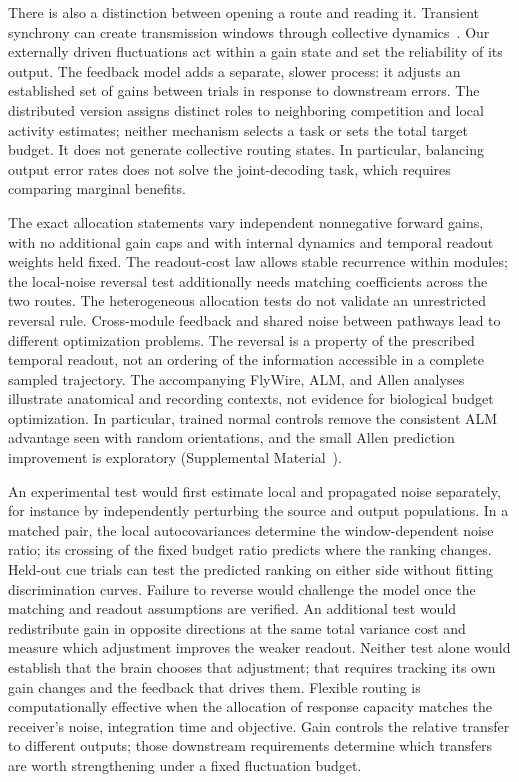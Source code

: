 \documentclass[aps,10pt,onecolumn,superscriptaddress,nofootinbib,longbibliography,
  amsmath,amssymb,floatfix]{revtex4-2}
\begin{document}
There is also a distinction between opening a route and reading
it. Transient synchrony can create transmission windows through
collective dynamics~\cite{palmigiano2017routing}. Our externally
driven fluctuations act within a gain state and set the reliability
of its output. The feedback model adds a separate, slower process:
it adjusts an established set of gains between trials in response
to downstream errors. The distributed version assigns distinct
roles to neighboring competition and local activity estimates;
neither mechanism selects a task or sets the total target budget.
It does not generate collective routing states.
In particular, balancing output error rates does not solve the
joint-decoding task, which requires comparing marginal benefits.

The exact allocation statements vary independent nonnegative forward
gains, with no additional gain caps and with internal dynamics and
temporal readout weights held fixed. The readout-cost law allows
stable recurrence within modules; the local-noise reversal test
additionally needs matching coefficients across the two routes.
The heterogeneous allocation tests do not validate an unrestricted
reversal rule. Cross-module feedback and shared noise between
pathways lead to different optimization problems. The reversal is a
property of the prescribed temporal readout, not an ordering of
the information accessible in a complete sampled trajectory.
The accompanying FlyWire, ALM, and Allen analyses illustrate
anatomical and recording contexts, not evidence for biological
budget optimization. In particular, trained normal controls remove
the consistent ALM advantage seen with random orientations, and
the small Allen prediction improvement is exploratory
(Supplemental Material~\cite{prrSupplement}).

An experimental test would first estimate local and propagated
noise separately, for instance by independently perturbing the
source and output populations. In a matched pair, the local
autocovariances determine the window-dependent noise ratio; its
crossing of the fixed budget ratio predicts where the ranking
changes. Held-out cue trials can test the predicted ranking on
either side without fitting discrimination curves. Failure to
reverse would challenge the model once the matching and readout
assumptions are verified. An additional test would redistribute
gain in opposite directions at the same total variance cost and
measure which adjustment improves the weaker readout. Neither
test alone would establish that the brain chooses that adjustment;
that requires tracking its own gain changes and the feedback that
drives them.
Flexible routing is computationally effective when the allocation
of response capacity matches the receiver's noise, integration time
and objective. Gain controls the relative transfer to different
outputs; those downstream requirements determine which transfers
are worth strengthening under a fixed fluctuation budget.
\end{document}
